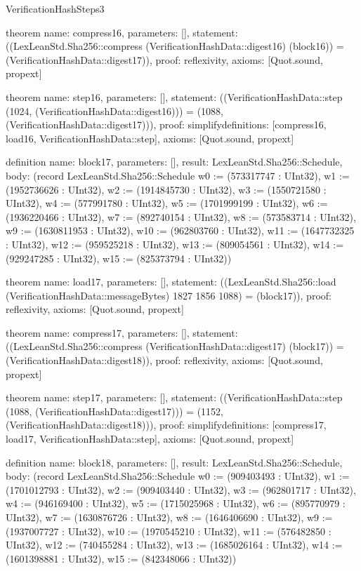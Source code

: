 \begin{lexlean}{VerificationHashSteps3}
\begin{semanticmodule}
theorem{
  name: compress16,
  parameters: [],
  statement: ((LexLeanStd.Sha256::compress (VerificationHashData::digest16) (block16)) = (VerificationHashData::digest17)),
  proof: reflexivity{},
  axioms: [Quot.sound, propext]
}

theorem{
  name: step16,
  parameters: [],
  statement: ((VerificationHashData::step (1024, (VerificationHashData::digest16))) = (1088, (VerificationHashData::digest17))),
  proof: simplify{definitions: [compress16, load16, VerificationHashData::step]},
  axioms: [Quot.sound, propext]
}

definition{
  name: block17,
  parameters: [],
  result: LexLeanStd.Sha256::Schedule,
  body: (record LexLeanStd.Sha256::Schedule {w0 := (573317747 : UInt32), w1 := (1952736626 : UInt32), w2 := (1914845730 : UInt32), w3 := (1550721580 : UInt32), w4 := (577991780 : UInt32), w5 := (1701999199 : UInt32), w6 := (1936220466 : UInt32), w7 := (892740154 : UInt32), w8 := (573583714 : UInt32), w9 := (1630811953 : UInt32), w10 := (962803760 : UInt32), w11 := (1647732325 : UInt32), w12 := (959525218 : UInt32), w13 := (809054561 : UInt32), w14 := (929247285 : UInt32), w15 := (825373794 : UInt32)})
}

theorem{
  name: load17,
  parameters: [],
  statement: ((LexLeanStd.Sha256::load (VerificationHashData::messageBytes) 1827 1856 1088) = (block17)),
  proof: reflexivity{},
  axioms: [Quot.sound, propext]
}

theorem{
  name: compress17,
  parameters: [],
  statement: ((LexLeanStd.Sha256::compress (VerificationHashData::digest17) (block17)) = (VerificationHashData::digest18)),
  proof: reflexivity{},
  axioms: [Quot.sound, propext]
}

theorem{
  name: step17,
  parameters: [],
  statement: ((VerificationHashData::step (1088, (VerificationHashData::digest17))) = (1152, (VerificationHashData::digest18))),
  proof: simplify{definitions: [compress17, load17, VerificationHashData::step]},
  axioms: [Quot.sound, propext]
}

definition{
  name: block18,
  parameters: [],
  result: LexLeanStd.Sha256::Schedule,
  body: (record LexLeanStd.Sha256::Schedule {w0 := (909403493 : UInt32), w1 := (1701012793 : UInt32), w2 := (909403440 : UInt32), w3 := (962801717 : UInt32), w4 := (946169400 : UInt32), w5 := (1715025968 : UInt32), w6 := (895770979 : UInt32), w7 := (1630876726 : UInt32), w8 := (1646406690 : UInt32), w9 := (1937007727 : UInt32), w10 := (1970545210 : UInt32), w11 := (576482850 : UInt32), w12 := (740455284 : UInt32), w13 := (1685026164 : UInt32), w14 := (1601398881 : UInt32), w15 := (842348066 : UInt32)})
}


\end{semanticmodule}
\end{lexlean}
